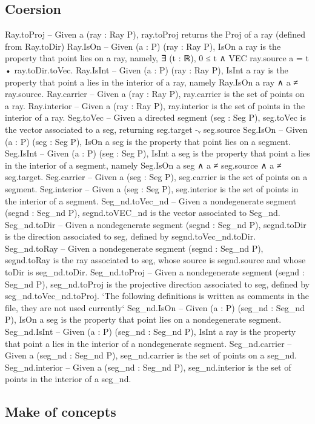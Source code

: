 \documentclass[12pt,a4paper]{article}
\begin{document}
\subsection{Coersion}
Ray.toProj -- Given a (ray : Ray P), ray.toProj returns the Proj of a ray (defined from Ray.toDir)
Ray.IsOn -- Given (a : P) (ray : Ray P), IsOn a ray is the property that point lies on a ray, namely, ∃ (t : ℝ), 0 ≤ t ∧ VEC ray.source a = t • ray.toDir.toVec.
Ray.IsInt -- Given (a : P) (ray : Ray P), IsInt a ray is the property that point a lies in the interior of a ray, namely Ray.IsOn a ray ∧ a ≠ ray.source.
Ray.carrier -- Given a (ray : Ray P), ray.carrier is the set of points on a ray.
Ray.interior -- Given a (ray : Ray P), ray.interior is the set of points in the interior of a ray.
Seg.toVec -- Given a directed segment (seg : Seg P), seg.toVec is the vector associated to a seg, returning seg.target -ᵥ seg.source
Seg.IsOn -- Given (a : P) (seg : Seg P), IsOn a seg is the property that point lies on a segment.
Seg.IsInt -- Given (a : P) (seg : Seg P), IsInt a seg is the property that point a lies in the interior of a segment, namely Seg.IsOn a seg ∧ a ≠ seg.source ∧ a ≠ seg.target.
Seg.carrier -- Given a (seg : Seg P), seg.carrier is the set of points on a segment.
Seg.interior -- Given a (seg : Seg P), seg.interior is the set of points in the interior of a segment.
Seg_nd.toVec_nd -- Given a nondegenerate segment (segnd : Seg_nd P), segnd.toVEC_nd is the vector associated to Seg_nd.
Seg_nd.toDir -- Given a nondegenerate segment (segnd : Seg_nd P), segnd.toDir is the direction associated to seg, defined by segnd.toVec_nd.toDir.
Seg_nd.toRay -- Given a nondegenerate segment (segnd : Seg_nd P), segnd.toRay is the ray associated to seg, whose source is segnd.source and whose toDir is seg_nd.toDir.
Seg_nd.toProj -- Given a nondegenerate segment (segnd : Seg_nd P), seg_nd.toProj is the projective direction associated to seg, defined by seg_nd.toVec_nd.toProj.
`The following definitions is written as comments in the file, they are not used currently`
  Seg_nd.IsOn -- Given (a : P) (seg_nd : Seg_nd P), IsOn a seg is the property that point lies on a nondegenerate segment.
  Seg_nd.IsInt -- Given (a : P) (seg_nd : Seg_nd P), IsInt a ray is the property that point a lies in the interior of a nondegenerate segment.
  Seg_nd.carrier -- Given a (seg_nd : Seg_nd P), seg_nd.carrier is the set of points on a seg_nd.
  Seg_nd.interior -- Given a (seg_nd : Seg_nd P), seg_nd.interior is the set of points in the interior of a seg_nd.


\subsection{Make of concepts}
\end{document}
